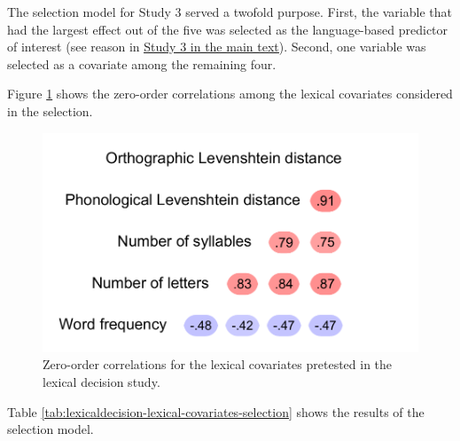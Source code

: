 \documentclass[
  12pt,
  man,floatsintext]{apa7}
\begin{document}
The selection model for Study 3 served a twofold purpose. First, the variable that had the largest effect out of the five was selected as the language-based predictor of interest (see reason in \protect\hyperlink{lexicaldecision}{\underline{Study 3 in the main text}}). Second, one variable was selected as a covariate among the remaining four.

Figure \ref{fig:lexicaldecision-lexical-covariates-correlations} shows the zero-order correlations among the lexical covariates considered in the selection.

\begin{figure}

{\centering \includegraphics[width=0.5\linewidth]{manuscript_files/figure-latex/lexicaldecision-lexical-covariates-correlations-1} 

}

\caption{Zero-order correlations for the lexical covariates pretested in the lexical decision study.}\label{fig:lexicaldecision-lexical-covariates-correlations}
\end{figure}

Table \ref{tab:lexicaldecision-lexical-covariates-selection} shows the results of the selection model.
\end{document}
